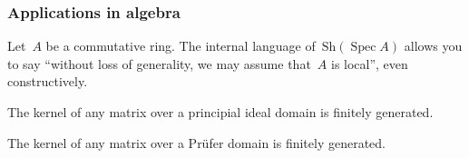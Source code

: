 \documentclass[12pt,utf8,notheorems,compress,t]{beamer}
\newcommand{\Sh}{\mathrm{Sh}}
\DeclareMathOperator{\Spec}{Spec}
\renewcommand{\_}{\mathpunct{.}}
\newcommand{\?}{\,{:}\,}
\begin{document}
\begin{frame}\frametitle{Applications in algebra}
  Let~$A$ be a commutative ring.
  The internal language of~$\Sh(\Spec A)$ allows you to say ``without loss of
  generality, we may assume that~$A$ is local'', even constructively.

  \begin{center}
    \begin{minipage}{0.75\textwidth}
      \begin{exampleblock}{}
        \justifying
        The kernel of any matrix over a principial ideal domain is finitely
        generated.
      \end{exampleblock}
    \end{minipage}
    \medskip

    \scalebox{3}{$\Downarrow$}

    \begin{minipage}{0.75\textwidth}
      \begin{exampleblock}{}
        \justifying
        The kernel of any matrix over a Prüfer domain is finitely generated.
      \end{exampleblock}
    \end{minipage}
  \end{center}
\end{frame}
\end{document}
